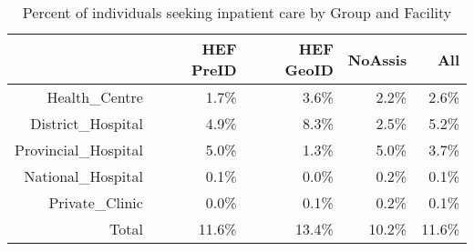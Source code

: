 \begin{table}[ht]
\centering
\begin{tabular}{rrrrr}
  \hline
 & HEF PreID & HEF GeoID & NoAssis & All \\ 
  \hline
Health\_Centre & 1.7\% & 3.6\% & 2.2\% & 2.6\% \\ 
  District\_Hospital & 4.9\% & 8.3\% & 2.5\% & 5.2\% \\ 
  Provincial\_Hospital & 5.0\% & 1.3\% & 5.0\% & 3.7\% \\ 
  National\_Hospital & 0.1\% & 0.0\% & 0.2\% & 0.1\% \\ 
  Private\_Clinic & 0.0\% & 0.1\% & 0.2\% & 0.1\% \\ 
  Total & 11.6\% & 13.4\% & 10.2\% & 11.6\% \\ 
   \hline
\end{tabular}
\caption{Percent of individuals seeking inpatient care by Group and Facility} 
\end{table}
